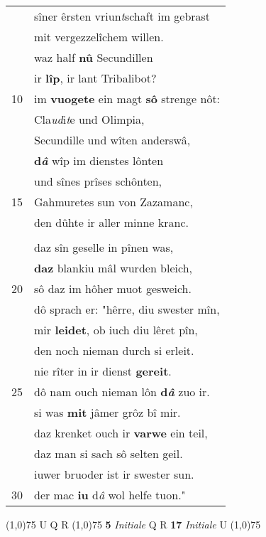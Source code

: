 \documentclass[8pt,a4paper,notitlepage]{article}
\begin{document}
\begin{table}[ht]
\begin{minipage}[t]{0.5\linewidth}
\begin{tabular}{rl}
 & sîner êrsten vriun\textit{t}schaft im gebrast\\ 
 & mit vergezzelîchem willen.\\ 
 & waz half \textbf{nû} Secundillen\\ 
 & ir \textbf{lîp}, ir lant Tribalibot?\\ 
10 & im \textbf{vuogete} ein magt \textbf{sô} strenge nôt:\\ 
 & Cla\textit{ud}i\textit{t}e und Olimpia,\\ 
 & Secundille und wîten anderswâ,\\ 
 & \textbf{d\textit{â}} wîp im dienstes lônten\\ 
 & und sînes prîses schônten,\\ 
15 & Gahmuretes sun von Zazamanc,\\ 
 & den dûhte ir aller minne kranc.\\ 
 & \textbf{\begin{large}N\end{large}û} sach der clâre Anfortas,\\ 
 & daz sîn geselle in pînen was,\\ 
 & \textbf{daz} blankiu mâl wurden bleich,\\ 
20 & sô daz im hôher muot gesweich.\\ 
 & dô sprach er: "hêrre, diu swester mîn,\\ 
 & mir \textbf{leidet}, ob iuch diu lêret pîn,\\ 
 & den noch nieman durch si erleit.\\ 
 & nie rîter in ir dienst \textbf{gereit}.\\ 
25 & dô nam ouch nieman lôn \textbf{d\textit{â}} zuo ir.\\ 
 & si was \textbf{mit} jâmer grôz bî mir.\\ 
 & daz krenket ouch ir \textbf{varwe} ein teil,\\ 
 & daz man si sach sô selten geil.\\ 
 & iuwer bruoder ist ir swester sun.\\ 
30 & der mac \textbf{iu} d\textit{â} wol helfe tuon."\\ 
\end{tabular}
\scriptsize
\line(1,0){75} \newline
U Q R \newline
\line(1,0){75} \newline
\textbf{5} \textit{Initiale} Q R  \textbf{17} \textit{Initiale} U  \newline
\line(1,0){75} \newline

\end{minipage}
\end{table}
\end{document}
